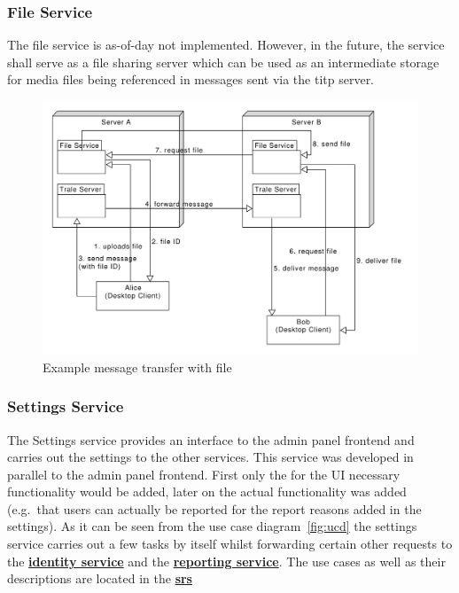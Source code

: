 \subsubsection{File Service}
The file service is as-of-day not implemented.
However, in the future, the service shall serve as a file sharing server which can be used as an intermediate storage
for media files being referenced in messages sent via the \ac{titp} server.

\begin{figure}[H]
    \centering
    \includegraphics[width=1.0\textwidth]{./graphics/fileService}
    \caption{Example message transfer with file}
    \label{fig:figure43}
\end{figure}

\pagebreak

\subsubsection{Settings Service}\label{subsubsec:settingsSer}

The Settings service provides an interface to the admin panel frontend and carries out the settings to the other
services.
This service was developed in parallel to the admin panel frontend. %
First only the for the UI necessary functionality would be added, later on the actual functionality was added
(e.g.\ that users can actually be reported for the report reasons added in the settings).
As it can be seen from the use case diagram~\ref{fig:ucd} the settings service carries out a few tasks by itself whilst
forwarding certain other requests to the \hyperref[subsubsec:identitySer]{\textbf{identity service}} and the
\hyperref[subsubsec:reportingSer]{\textbf{reporting service}}.
The use cases as well as their descriptions are located in the
\hyperref[ch:software-requirements-specification-(srs)]{\textbf{\ac{srs}}}

